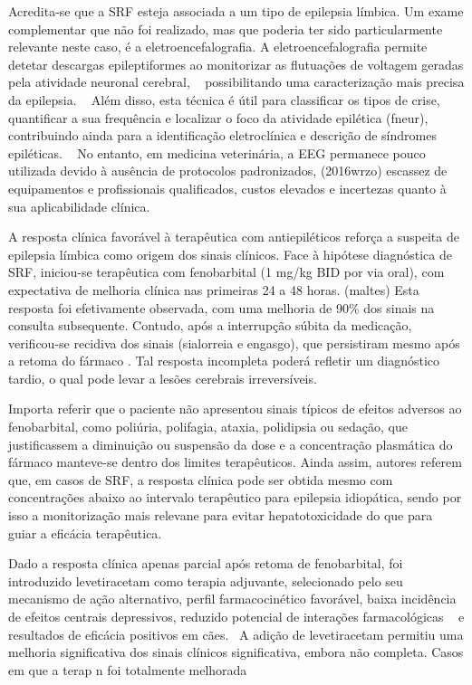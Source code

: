Acredita-se que a SRF esteja associada a um tipo de epilepsia límbica. Um exame complementar que não foi realizado, mas que poderia ter sido particularmente relevante neste caso, é a eletroencefalografia. A eletroencefalografia permite detetar descargas epileptiformes ao monitorizar as flutuações de voltagem geradas pela atividade neuronal cerebral, ~\cite{Wang2025} possibilitando uma caracterização mais precisa da epilepsia. ~\cite{Lyon2024} Além disso, esta técnica é útil para classificar os tipos de crise, quantificar a sua frequência e localizar o foco da atividade epilética (fneur), contribuindo ainda para a identificação eletroclínica e descrição de síndromes epiléticas. ~\cite{Lyon2024} No entanto, em medicina veterinária, a EEG permanece pouco utilizada devido à ausência de protocolos padronizados, (2016wrzo) escassez de equipamentos e profissionais qualificados, custos elevados e incertezas quanto à sua aplicabilidade clínica. ~\cite{Everest2024}~\cite{Luca2023}


A resposta clínica favorável à terapêutica com antiepiléticos reforça a suspeita  de epilepsia límbica como origem dos sinais clínicos. Face à hipótese diagnóstica de SRF, iniciou-se terapêutica com fenobarbital (1 mg/kg BID por via oral), com expectativa de melhoria clínica nas primeiras 24 a 48 horas. (maltes) Esta resposta foi efetivamente observada, com uma melhoria de 90\% dos sinais na consulta subsequente. Contudo, após a interrupção súbita da medicação, verificou-se recidiva dos sinais (sialorreia e engasgo), que persistiram mesmo após a retoma do fármaco . Tal resposta incompleta poderá refletir um diagnóstico tardio, o qual pode levar a lesões cerebrais irreversíveis. ~\cite{Wang2025}


Importa referir que o paciente não apresentou sinais típicos de efeitos adversos ao fenobarbital, como poliúria, polifagia, ataxia, polidipsia ou sedação, que justificassem a diminuição ou suspensão da dose e a concentração plasmática do fármaco manteve-se dentro dos limites terapêuticos. Ainda assim, autores referem que, em casos de SRF, a resposta clínica pode ser obtida mesmo com concentrações abaixo ao intervalo terapêutico para epilepsia idiopática, sendo por isso a monitorização mais relevane para evitar hepatotoxicidade do que para guiar a eficácia terapêutica.


Dado a resposta clínica apenas parcial após retoma de fenobarbital, foi introduzido levetiracetam como terapia adjuvante, selecionado pelo seu mecanismo de ação alternativo, perfil farmacocinético favorável, baixa incidência de efeitos centrais depressivos, reduzido potencial de interações farmacológicas ~\cite{Deshpande2014} e resultados de eficácia positivos em cães.~\cite{ajvr}  A adição de levetiracetam permitiu uma melhoria significativa dos sinais clínicos significativa, embora não completa. Casos em que a terap n foi totalmente melhorada


